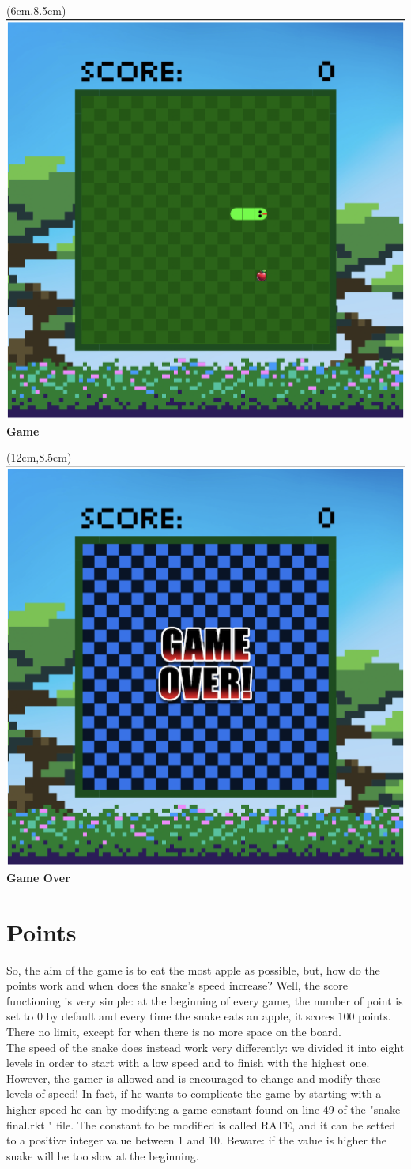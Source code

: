 \documentclass{article}
\begin{document}
	\begin{textblock*}{10cm}(6cm,8.5cm)
		\centering
		\includegraphics[width=.5\linewidth]{game.png}\\
		\Large{\textbf{Game}}
	\end{textblock*}
	
	\begin{textblock*}{10cm}(12cm,8.5cm)
		\centering
		\includegraphics[width=.5\linewidth]{game-over.png}\\
		\Large{\textbf{Game Over}}
	\end{textblock*}
	
	\vspace{6.5cm}\section{Points}
	So, the aim of the game is to eat the most apple as possible, but, how do the points work and when does the snake's speed increase? Well, the score functioning is very simple: at the beginning of every game, the number of point is set to 0 by default and every time the snake eats an apple, it scores 100 points. There no limit, except for when there is no more space on the board.\\
	The speed of the snake does instead work very differently: we divided it into eight levels in order to start with a low speed and to finish with the highest one. However, the gamer is allowed and is encouraged to change and modify these levels of speed! In fact, if he wants to complicate the game by starting with a higher speed he can by modifying a game constant found on line 49 of the "snake-final.rkt " file. The constant to be modified is called RATE, and it can be setted to a positive integer value between 1 and 10. Beware: if the value is higher the snake will be too slow at the beginning.
	
\end{document}
